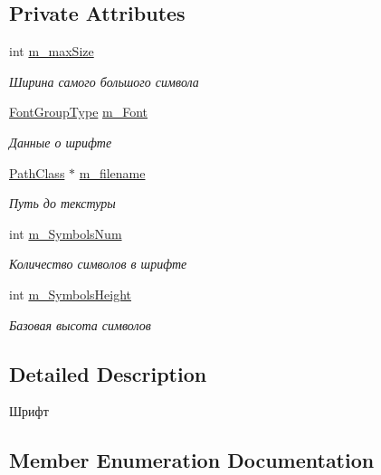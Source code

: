 \subsection*{Private Attributes}
\begin{DoxyCompactItemize}
\item 
int \hyperlink{class_font_class_a2c71f5ae90c0856046d51f7bb788c6b5}{m\+\_\+max\+Size}
\begin{DoxyCompactList}\small\item\em Ширина самого большого символа \end{DoxyCompactList}\item 
\hyperlink{struct_font_class_1_1_font_group_type}{Font\+Group\+Type} \hyperlink{class_font_class_a7d11fa1b4089911182168c8ca33f628b}{m\+\_\+\+Font}
\begin{DoxyCompactList}\small\item\em Данные о шрифте \end{DoxyCompactList}\item 
\hyperlink{class_path_class}{Path\+Class} $\ast$ \hyperlink{class_font_class_ad6e25dd537928a957406e2502969c0f9}{m\+\_\+filename}
\begin{DoxyCompactList}\small\item\em Путь до текстуры \end{DoxyCompactList}\item 
int \hyperlink{class_font_class_a960601d7c7d1786b28a2f6e9988bd63d}{m\+\_\+\+Symbols\+Num}
\begin{DoxyCompactList}\small\item\em Количество символов в шрифте \end{DoxyCompactList}\item 
int \hyperlink{class_font_class_a062ca165f46eb5d64f53c8452139b9f7}{m\+\_\+\+Symbols\+Height}
\begin{DoxyCompactList}\small\item\em Базовая высота символов \end{DoxyCompactList}\end{DoxyCompactItemize}


\subsection{Detailed Description}
Шрифт 

\subsection{Member Enumeration Documentation}
\mbox{\label{class_font_class_a66bce9a04891356d0db3e0115ea6971a}} 
